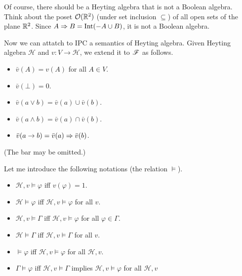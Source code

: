 Of course, there should be a Heyting algebra that is not a Boolean
algebra. Think about the poset $\mathcal{O}(\mathbb{R}^2)$ (under set inclusion 
$\subseteq$) of all open sets of the plane $\mathbb{R}^2$. Since 
$A\Rightarrow B=\text{Int}(-A\cup B)$, it is not a Boolean algebra. 

\newcommand{\Heyting}{\mathcal{H}}
Now we can attatch to IPC a semantics of Heyting algebra.
Given Heyting algebra $\Heyting$ and $v: V\to \Heyting$, we
extend it to $\mathscr{F}$ as follows.
\begin{itemize}
    \item $\bar{v}(A)=v(A)$ for all $A\in V$.
    \item $\bar{v}(\bot)=0$.
    \item $\bar{v}(a\vee b)=\bar{v}(a)\cup \bar{v}(b)$.
    \item $\bar{v}(a\wedge b)=\bar{v}(a)\cap \bar{v}(b)$.
    \item $\bar{v}(a\to b)=\bar{v}(a)\Rightarrow \bar{v}(b)$.
\end{itemize}
(The bar may be omitted.)

Let me introduce the following notations (the relation $\models$).
\begin{itemize}
    \item $\Heyting,v\models \varphi$ iff $v(\varphi) = 1$.
    \item $\Heyting\models\varphi$ iff $\Heyting,v\models\varphi$ for all $v$.
    \item $\Heyting,v\models \Gamma$ iff $\Heyting,v\models \varphi$ for all $\varphi\in\Gamma$.
    \item $\Heyting\models\Gamma$ iff $\Heyting,v\models\Gamma$ for all $v$.
    \item $\models\varphi$ iff $\Heyting,v\models\varphi$ for all $\Heyting, v$.
    \item $\Gamma\models\varphi$ iff $\Heyting,v\models\Gamma$ implies $\Heyting,v\models\varphi$ for all $\Heyting, v$
\end{itemize}

